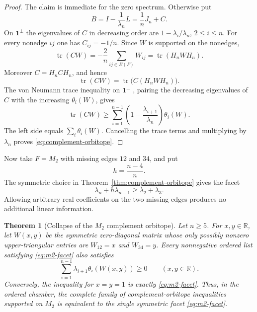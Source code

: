 \documentclass[11pt,reqno]{amsart}
\newtheorem{theorem}{Theorem}[section]
\theoremstyle{definition}
\theoremstyle{remark}
\newcommand{\one}{\mathbf 1}
\newcommand{\R}{\mathbb R}
\newcommand{\tr}{\operatorname{tr}}
\begin{document}
\begin{proof}
The claim is immediate for the zero spectrum.  Otherwise put
\[
  B=I-\frac1{\lambda_n}L=\frac1nJ_n+C.
\]
On $\one^\perp$ the eigenvalues of $C$ in decreasing order are
$1-\lambda_i/\lambda_n$, $2\le i\le n$.  For every nonedge $ij$ one has
$C_{ij}=-1/n$.  Since $W$ is supported on the nonedges,
\[
  \tr(CW)=-\frac2n\sum_{ij\in E(F)}W_{ij}
  =\tr(H_nWH_n).
\]
Moreover $C=H_nCH_n$, and hence
\[
  \tr(CW)=\tr\bigl(C(H_nWH_n)\bigr).
\]
The von Neumann trace inequality on $\one^\perp$
\cite[Chapters~II--III]{Bhatia1997}, pairing the decreasing
eigenvalues of $C$ with the increasing $\theta_i(W)$, gives
\[
  \tr(CW)\ge
  \sum_{i=1}^{n-1}\left(1-\frac{\lambda_{i+1}}{\lambda_n}\right)
  \theta_i(W).
\]
The left side equals $\sum_i\theta_i(W)$.  Cancelling the trace terms and
multiplying by $\lambda_n$ proves \eqref{eq:complement-orbitope}.
\end{proof}

Now take $F=M_2$ with missing edges $12$ and $34$, and put
\begin{equation}\label{eq:m2-h}
  h=\frac{n-4}{n}.
\end{equation}
The symmetric choice in Theorem~\ref{thm:complement-orbitope} gives the
facet
\begin{equation}\label{eq:m2-facet}
  \lambda_n+h\lambda_{n-1}\ge\lambda_2+\lambda_3.
\end{equation}
Allowing arbitrary real coefficients on the two missing edges produces no
additional linear information.

\begin{theorem}[Collapse of the $M_2$ complement orbitope]
\label{thm:m2-orbitope-collapse}
Let $n\ge5$.  For $x,y\in\R$, let $W(x,y)$ be the symmetric zero-diagonal
matrix whose only possibly nonzero upper-triangular entries are
$W_{12}=x$ and $W_{34}=y$.  Every nonnegative ordered list satisfying
\eqref{eq:m2-facet} also satisfies
\[
  \sum_{i=1}^{n-1}\lambda_{i+1}\theta_i(W(x,y))\ge0
  \qquad(x,y\in\R).
\]
Conversely, the inequality for $x=y=1$ is exactly
\eqref{eq:m2-facet}.  Thus, in the ordered chamber, the complete family of
complement-orbitope inequalities supported on $M_2$ is equivalent to the
single symmetric facet \eqref{eq:m2-facet}.
\end{theorem}
\end{document}
